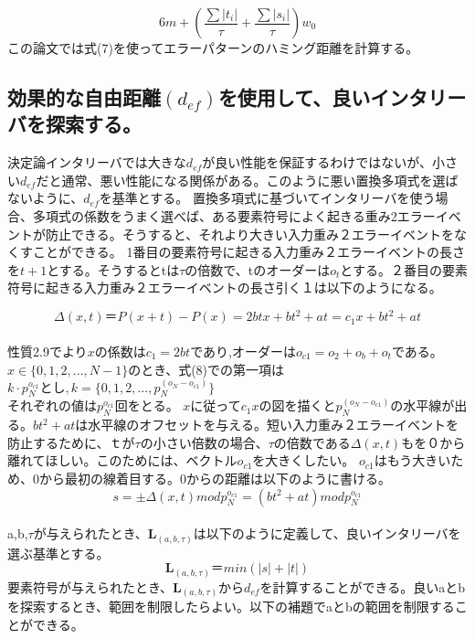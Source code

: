 \documentclass[20 pts]{article}
\begin{document}
\begin{equation}\tag{7}
6m+ \left( \frac{\sum \left|t_i\right|}{\tau}+\frac{\sum \left|s_i\right|}{\tau}\right)w_0
\end{equation}
この論文では式(7)を使ってエラーパターンのハミング距離を計算する。

\subsection{効果的な自由距離$(d_{ef})$を使用して、良いインタリーバを探索する。}
決定論インタリーバでは大きな$d_{ef}$が良い性能を保証するわけではないが、小さい$d_{ef}$だと通常、悪い性能になる関係がある。このように悪い置換多項式を選ばないように、$d_{ef}$を基準とする。
置換多項式に基づいてインタリーバを使う場合、多項式の係数をうまく選べば、ある要素符号によく起きる重み2エラーイベントが防止できる。そうすると、それより大きい入力重み２エラーイベントをなくすことができる。
1番目の要素符号に起きる入力重み２エラーイベントの長さを$t+1$とする。そうするとtは$\tau$の倍数で、tのオーダーは$o_t$とする。２番目の要素符号に起きる入力重み２エラーイベントの長さ引く１は以下のようになる。

\begin{equation}\tag{8}
\Delta(x,t)＝P(x+t)-P(x)=2btx+bt^2+at=c_1x+bt^2+at 
\end{equation}
\paragraph{}
性質2.9でより$x$の係数は$c_1=2bt$であり,オーダーは$o_{c1}=o_2+o_b+o_t$である。$x\in\{0,1,2,...,N-1\}$のとき、式(8)での第一項は$k\cdot p_N^{o_{c1}}とし,k=\{0,1,2,...,p_N^{(o_N-o_{c1})}\}$\\それぞれの値は$p_N^{o_{c1}}$回をとる。
$x$に従って$c_1x$の図を描くと$p_N^{(o_N-o_{c1})}$の水平線が出る。$bt^2+at$は水平線のオフセットを与える。短い入力重み２エラーイベントを防止するために、ｔが$\tau$の小さい倍数の場合、$\tau$の倍数である$\Delta(x,t)$もを０から離れてほしい。このためには、ベクトル$o_{c1}$を大きくしたい。
$o_{c1}$はもう大きいため、0から最初の線着目する。0からの距離は以下のように書ける。
\begin{equation}\tag{9}
s=\pm \Delta(x,t) mod p_N^{o_{c1}} =( bt^2+at) mod p_N^{o_{c1}}
\end{equation}
\paragraph{}
a,b,$\tau$が与えられたとき、$\mathbf{L}_{(a,b,\tau)}$は以下のように定義して、良いインタリーバを選ぶ基準とする。
$$\mathbf{L}_{(a,b,\tau)}＝min⁡(|s|+|t|)$$
要素符号が与えられたとき、$\mathbf{L}_(a,b,\tau)$から$d_{ef}$を計算することができる。良いaとbを探索するとき、範囲を制限したらよい。以下の補題でaとbの範囲を制限することができる。
\end{document}
